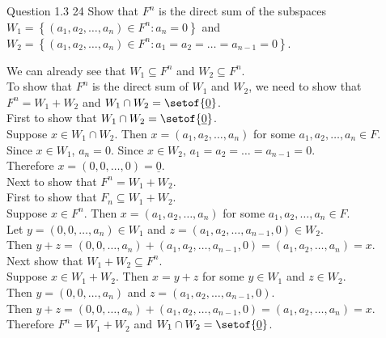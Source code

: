 \documentclass[answers,12pt,addpoints]{exam}
\begin{document}
\begin{questions}
    \question Question 1.3 24
    Show that $F^n$ is the direct sum of the subspaces \\
    $W_1 = \left\{\left(a_1, a_2, \dots, a_n \right) \in F^n : a_n = 0\right\}$ and  $W_2 = \left\{(a_1, a_2, \dots, a_n) \in F^n : a_1 = a_2 = \dots = a_{n-1} = 0\right\}$.
    \begin{solution}
        We can already see that $W_1 \subseteq F^n$ and $W_2 \subseteq F^n$.\\
        To show that $F^n$ is the direct sum of $W_1$ and $W_2$, we need to show that $F^n = W_1 + W_2$ and $W_1 \cap W_2 = \setof{\underline{0}}$.\\
        First to show that $W_1 \cap W_2 = \setof{\underline{0}}$.\\
        Suppose $x \in W_1 \cap W_2$. Then $x = (a_1, a_2, \dots, a_n)$ for some $a_1, a_2, \dots, a_n \in F$.\\
        Since $x \in W_1$, $a_n = 0$. Since $x \in W_2$, $a_1 = a_2 = \dots = a_{n-1} = 0$.\\
        Therefore $x = (0, 0, \dots, 0) = \underline{0}$.\\
        Next to show that $F^n = W_1 + W_2$.\\
        First to show that $F_n \subseteq W_1 + W_2$.\\
        Suppose $x \in F^n$. Then $x = (a_1, a_2, \dots, a_n)$ for some $a_1, a_2, \dots, a_n \in F$.\\
        Let $y = (0, 0, \dots, a_n) \in W_1$ and $z = (a_1, a_2, \dots, a_{n-1}, 0) \in W_2$.\\
        Then $y + z = (0, 0, \dots, a_n) + (a_1, a_2, \dots, a_{n-1}, 0) = (a_1, a_2, \dots, a_n) = x$.\\
        Next show that $W_1 + W_2 \subseteq F^n$.\\
        Suppose $x \in W_1 + W_2$. Then $x = y + z$ for some $y \in W_1$ and $z \in W_2$.\\
        Then $y = (0, 0, \dots, a_n)$ and $z = (a_1, a_2, \dots, a_{n-1}, 0)$.\\
        Then $y + z = (0, 0, \dots, a_n) + (a_1, a_2, \dots, a_{n-1}, 0) = (a_1, a_2, \dots, a_n) = x$.\\
        Therefore $F^n = W_1 + W_2$ and $W_1 \cap W_2 = \setof{\underline{0}}$.
    \end{solution}


\end{questions}
\end{document}
